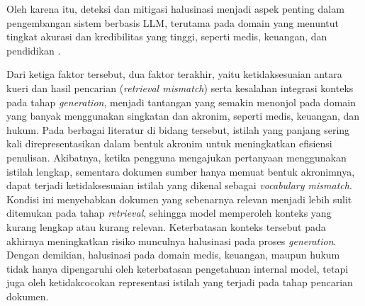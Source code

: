 Oleh karena itu, deteksi dan mitigasi halusinasi menjadi aspek penting dalam pengembangan sistem berbasis LLM, terutama pada domain yang menuntut tingkat akurasi dan kredibilitas yang tinggi, seperti medis, keuangan, dan pendidikan \parencite{math2024hallucination}.

Dari ketiga faktor tersebut, dua faktor terakhir, yaitu ketidaksesuaian antara kueri dan hasil pencarian (\textit{retrieval mismatch}) serta kesalahan integrasi konteks pada tahap \textit{generation}, menjadi tantangan yang semakin menonjol pada domain yang banyak menggunakan singkatan dan akronim, seperti medis, keuangan, dan hukum. Pada berbagai literatur di bidang tersebut, istilah yang panjang sering kali direpresentasikan dalam bentuk akronim untuk meningkatkan efisiensi penulisan. Akibatnya, ketika pengguna mengajukan pertanyaan menggunakan istilah lengkap, sementara dokumen sumber hanya memuat bentuk akronimnya, dapat terjadi ketidaksesuaian istilah yang dikenal sebagai \textit{vocabulary mismatch}. Kondisi ini menyebabkan dokumen yang sebenarnya relevan menjadi lebih sulit ditemukan pada tahap \textit{retrieval}, sehingga model memperoleh konteks yang kurang lengkap atau kurang relevan. Keterbatasan konteks tersebut pada akhirnya meningkatkan risiko munculnya halusinasi pada proses \textit{generation}. Dengan demikian, halusinasi pada domain medis, keuangan, maupun hukum tidak hanya dipengaruhi oleh keterbatasan pengetahuan internal model, tetapi juga oleh ketidakcocokan representasi istilah yang terjadi pada tahap pencarian dokumen.





